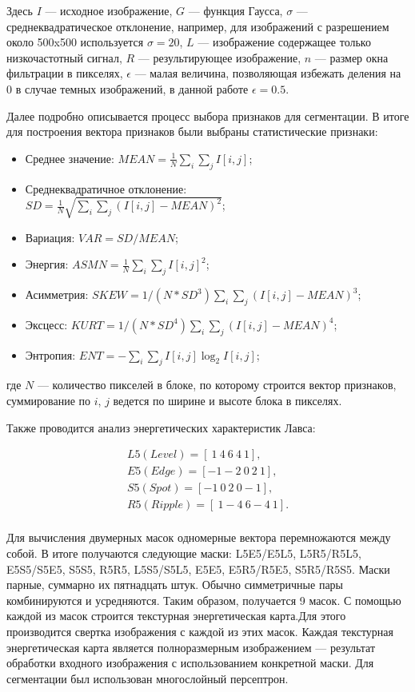  \noindent Здесь $I$ --- исходное изображение, $G$ --- функция Гаусса, $\sigma$ --- среднеквадратическое отклонение, например, для изображений с разрешением около 500x500 используется $\sigma = 20$, $L$ --- изображение содержащее только низкочастотный сигнал, $R$ --- результирующее изображение, $n$ --- размер окна фильтрации в пикселях, $\epsilon$ --- малая величина, позволяющая избежать деления на 0 в случае темных изображений, в данной работе $\epsilon=0.5$.

Далее подробно описывается процесс выбора признаков для сегментации. В итоге для построения вектора признаков были выбраны статистические признаки:

\begin{itemize}
	\item Среднее значение: $MEAN = \frac{1}{N} \sum_{i}\sum_{j}I[i,j] $;
	\item Среднеквадратичное отклонение: \\
	$SD=\frac{1}{N} \sqrt{\sum_{i}\sum_{j} (I[i,j] - MEAN)^2} $;
	\item Вариация: $VAR= SD / MEAN$;
	\item Энергия: $ ASMN=\frac{1}{N}\sum_{i}\sum_{j}I[i,j]^2 $;
	\item Асимметрия: $SKEW= 1 / (N*SD^3) \sum_{i}\sum_{j} (I[i,j] - MEAN)^3 $;
	\item Эксцесс: $ KURT=1 / (N*SD^4) \sum_{i}\sum_{j} (I[i,j] - MEAN)^4 $;
	\item Энтропия: $ ENT=-\sum_{i}\sum_{j}I[i,j]\log_2{I[i,j]} $;	
\end{itemize}

\noindent где $N$ --- количество пикселей в блоке, по которому строится вектор признаков, суммирование по $i$, $j$ ведется по ширине и высоте блока в пикселях.

Также проводится анализ энергетических характеристик Лавса:

$$
\begin{aligned}
L5 (Level) =  [~1~4~6~4~1],\\
E5 (Edge) =  [-1 -2~0~2~1],\\
S5 (Spot) =  [-1~0~2~0 -1],\\
R5 (Ripple) =  [~1 -4~6 -4~1].\\
\end{aligned}
$$

Для вычисления двумерных масок одномерные вектора перемножаются между собой. В итоге получаются следующие маски: L5E5/E5L5,  L5R5/R5L5,  E5S5/S5E5,  S5S5,  R5R5,  L5S5/S5L5,  E5E5,  E5R5/R5E5,  S5R5/R5S5. Маски парные, суммарно их пятнадцать штук. Обычно симметричные пары комбинируются и усредняются. Таким образом, получается 9 масок. С помощью каждой из масок строится текстурная энергетическая карта.Для этого производится свертка изображения с каждой из этих масок. Каждая текстурная энергетическая карта является полноразмерным изображением --- результат обработки входного изображения с использованием конкретной маски. Для сегментации был использован многослойный персептрон.

